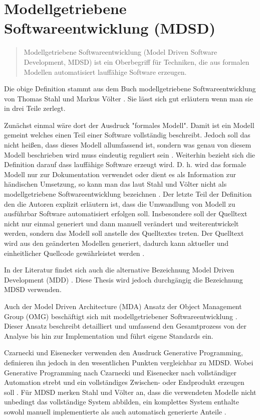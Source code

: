 \documentclass[12pt,oneside,a4paper,parskip]{scrbook}
\begin{document}
\section{Modellgetriebene Softwareentwicklung (MDSD)}

\begin{quote}\glqq Modellgetriebene Softwareentwicklung (Model Driven Software Development, MDSD) ist ein Oberbegriff für Techniken, die aus formalen Modellen automatisiert lauffähige Software erzeugen.\grqq \end{quote}

Die obige Definition stammt aus dem Buch modellgetriebene Softwareentwicklung von Thomas Stahl und Markus Völter \cite[S. 11]{stahl2007}. Sie lässt sich gut erläutern wenn man sie in drei Teile zerlegt.

Zunächst einmal wäre dort der Ausdruck "formales Modell". Damit ist ein Modell gemeint welches einen Teil einer Software vollständig beschreibt. Jedoch soll das nicht heißen, dass dieses Modell allumfassend ist, sondern was genau von diesem Modell beschrieben wird muss eindeutig reguliert sein \cite[S. 11f.]{stahl2007}. Weiterhin bezieht sich die Definition darauf dass lauffähige Software erzeugt wird. D. h. wird das formale Modell nur zur Dokumentation verwendet oder dient es als Information zur händischen Umsetzung, so kann man das laut Stahl und Völter nicht als modellgetriebene Softwareentwicklung bezeichnen \cite[S. 12]{stahl2007}. Der letzte Teil der Definition den die Autoren explizit erläutern ist, dass die Umwandlung von Modell zu ausführbar Software automatisiert erfolgen soll. Insbesondere soll der Quelltext nicht nur einmal generiert und dann manuell verändert und weiterentwickelt werden, sondern das Modell soll anstelle des Quelltextes treten. Der Quelltext wird aus den geänderten Modellen generiert, dadurch kann aktueller und einheitlicher Quellcode gewährleistet werden \cite[S. 13]{stahl2007}.

In der Literatur findet sich auch die alternative Bezeichnung Model Driven Development (MDD) \cite{selic2003,atkinson2003}. Diese Thesis wird jedoch durchgängig die Bezeichnung MDSD verwenden.

Auch der Model Driven Architecture (MDA) Ansatz der Object Management Group (OMG) beschäftigt sich mit modellgetriebener Softwareentwicklung \cite{mdaguide}. Dieser Ansatz beschreibt detailliert und umfassend den Gesamtprozess von der Analyse bis hin zur Implementation und führt eigene Standards ein. 

Czarnecki und Eisenecker verwenden den Ausdruck Generative Programming, definieren ihn jedoch in den wesentlichen Punkten vergleichbar zu MDSD. Wobei Generative Programming nach Czarnecki und Eisenecker nach vollständiger Automation strebt und ein vollständiges Zwischen- oder Endprodukt erzeugen soll \cite[S. 5]{czaeis2000}. Für MDSD merken Stahl und Völter an, dass die verwendeten Modelle nicht unbedingt das vollständige System abbilden, ein komplettes System enthalte sowohl manuell implementierte als auch automatisch generierte Anteile \cite[S. 13]{stahl2007}.
\end{document}
